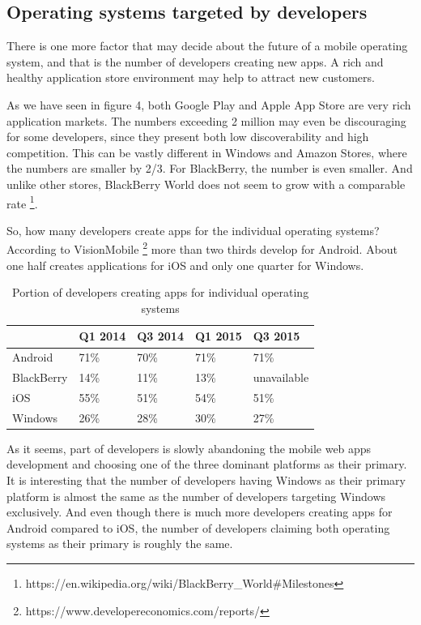 \documentclass[english,master,public,dept460,male,cpdeclaration,oneside]{diploma}
\begin{document}
\subsection{Operating systems targeted by developers}
There is one more factor that may decide about the future of a mobile operating system, and that is the number of developers creating new apps. A rich and healthy application store environment may help to attract new customers. 

As we have seen in figure 4, both Google Play and Apple App Store are very rich application markets. The numbers exceeding 2 million may even be discouraging for some developers, since they present both low discoverability and high competition. This can be vastly different in Windows and Amazon Stores, where the numbers are smaller by 2/3. For BlackBerry, the number is even smaller. And unlike other stores, BlackBerry World does not seem to grow with a comparable rate \footnote{https://en.wikipedia.org/wiki/BlackBerry\_World\#Milestones}. 

So, how many developers create apps for the individual operating systems? According to VisionMobile \footnote{https://www.developereconomics.com/reports/} more than two thirds develop for Android. About one half creates applications for iOS and only one quarter for Windows.

\begin{table}
	\centering
	\caption{Portion of developers creating apps for individual operating systems}
	\begin{tabular}{l l l l l}
		\toprule
		 & Q1 2014 & Q3 2014 & Q1 2015 & Q3 2015 \\
		\midrule
		Android & 71\% & 70\% & 71\% & 71\% \\
		BlackBerry & 14\% & 11\% & 13\% & unavailable \\
		iOS & 55\% & 51\% & 54\% & 51\% \\
		Windows & 26\% & 28\% & 30\% & 27\% \\
		\midrule
	\end{tabular}
\end{table}

As it seems, part of developers is slowly abandoning the mobile web apps development and choosing one of the three dominant platforms as their primary. It is interesting that the number of developers having Windows as their primary platform is almost the same as the number of developers targeting Windows exclusively. And even though there is much more developers creating apps for Android compared to iOS, the number of developers claiming both operating systems as their primary is roughly the same.
\end{document}
